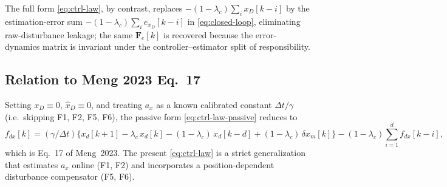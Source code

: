 \documentclass[11pt,a4paper]{ctexart}
\newcommand{\dt}{\Delta t}
\newcommand{\lc}{\lambda_c}
\newcommand{\fdx}{f_{dx}}
\newcommand{\dxm}{\delta x_m}
\newcommand{\xD}{x_D}
\newcommand{\ax}{a_x}
\newcommand{\xDhat}{\hat x_D}
\newcommand{\Fe}{\mathbf{F}_e}
\newcommand{\exD}{e_{x_D}}
\begin{document}
The full form \eqref{eq:ctrl-law}, by contrast, replaces $-(1{-}\lc)\!\sum_i \xD[k{-}i]$ by the estimation-error sum $-(1{-}\lc)\!\sum_i \exD[k{-}i]$ in \eqref{eq:closed-loop}, eliminating raw-disturbance leakage; the same $\Fe[k]$ is recovered because the error-dynamics matrix is invariant under the controller--estimator split of responsibility.

\subsection{Relation to Meng 2023 Eq.~17}
\label{app:meng}

Setting $\xD \equiv 0$, $\xDhat \equiv 0$, and treating $\ax$ as a known calibrated constant $\dt/\gamma$ (i.e.\ skipping F1, F2, F5, F6), the passive form \eqref{eq:ctrl-law-passive} reduces to
\begin{equation}
\fdx[k] = (\gamma/\dt)\bigl\{x_d[k{+}1] - \lc\,x_d[k] - (1{-}\lc)\,x_d[k{-}d] + (1{-}\lc)\,\dxm[k]\bigr\}
         - (1{-}\lc)\!\sum_{i=1}^{d}\!\fdx[k{-}i],
\label{eq:ctrl-law-meng}
\end{equation}
which is Eq.~17 of Meng~2023. The present \eqref{eq:ctrl-law} is a strict generalization that estimates $\ax$ online (F1, F2) and incorporates a position-dependent disturbance compensator (F5, F6).
\end{document}
